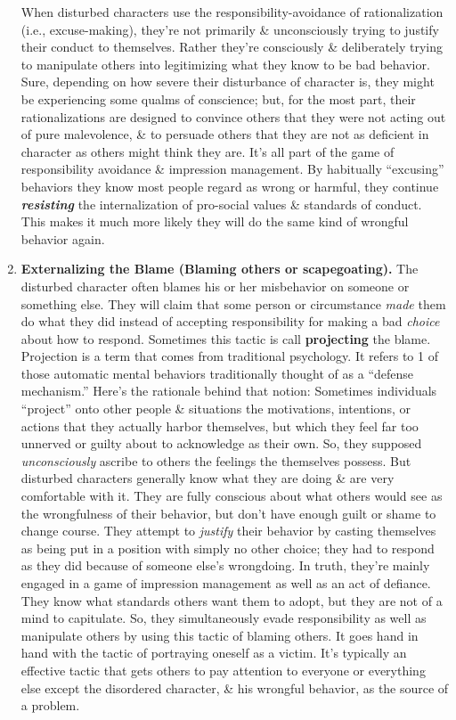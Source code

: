 \documentclass{article}
\numberwithin{equation}{section}
\begin{document}
\begin{enumerate}
	When disturbed characters use the responsibility-avoidance of rationalization (i.e., excuse-making), they're not primarily \& unconsciously trying to justify their conduct to themselves. Rather they're consciously \& deliberately trying to manipulate others into legitimizing what they know to be bad behavior. Sure, depending on how severe their disturbance of character is, they might be experiencing some qualms of conscience; but, for the most part, their rationalizations are designed to convince others that they were not acting out of pure malevolence, \& to persuade others that they are not as deficient in character as others might think they are. It's all part of the game of responsibility avoidance \& impression management. By habitually ``excusing'' behaviors they know most people regard as wrong or harmful, they continue \textbf{\textit{resisting}} the internalization of pro-social values \& standards of conduct. This makes it much more likely they will do the same kind of wrongful behavior again.
	\item \textbf{Externalizing the Blame (Blaming others or scapegoating).} The disturbed character often blames his or her misbehavior on someone or something else. They will claim that some person or circumstance \textit{made} them do what they did instead of accepting responsibility for making a bad \textit{choice} about how to respond. Sometimes this tactic is call \textbf{projecting} the blame. Projection is a term that comes from traditional psychology. It refers to 1 of those automatic mental behaviors traditionally thought of as a ``defense mechanism.'' Here's the rationale behind that notion: Sometimes individuals ``project'' onto other people \& situations the motivations, intentions, or actions that they actually harbor themselves, but which they feel far too unnerved or guilty about to acknowledge as their own. So, they supposed \textit{unconsciously} ascribe to others the feelings the themselves possess. But disturbed characters generally know what they are doing \& are very comfortable with it. They are fully conscious about what others would see as the wrongfulness of their behavior, but don't have enough guilt or shame to change course. They attempt to \textit{justify} their behavior by casting themselves as being put in a position with simply no other choice; they had to respond as they did because of someone else's wrongdoing. In truth, they're mainly engaged in a game of impression management as well as an act of defiance. They know what standards others want them to adopt, but they are not of a mind to capitulate. So, they simultaneously evade responsibility as well as manipulate others by using this tactic of blaming others. It goes hand in hand with the tactic of portraying oneself as a victim. It's typically an effective tactic that gets others to pay attention to everyone or everything else except the disordered character, \& his wrongful behavior, as the source of a problem.
	

\end{enumerate}
\end{document}
